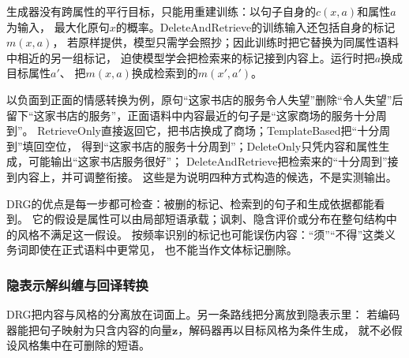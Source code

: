 生成器没有跨属性的平行目标，只能用重建训练：以句子自身的$c(x,a)$和属性$a$为输入，
最大化原句$x$的概率。DeleteAndRetrieve的训练输入还包括自身的标记$m(x,a)$，
若原样提供，模型只需学会照抄；因此训练时把它替换为同属性语料中相近的另一组标记，
迫使模型学会把检索来的标记接到内容上。运行时把$a$换成目标属性$a'$、
把$m(x,a)$换成检索到的$m(x',a')$。

以负面到正面的情感转换为例，原句“这家书店的服务令人失望”删除“令人失望”后
留下“这家书店的服务”，正面语料中内容最近的句子是“这家商场的服务十分周到”。
RetrieveOnly直接返回它，把书店换成了商场；TemplateBased把“十分周到”填回空位，
得到“这家书店的服务十分周到”；DeleteOnly只凭内容和属性生成，可能输出“这家书店服务很好”；
DeleteAndRetrieve把检索来的“十分周到”接到内容上，并可调整衔接。
这些是为说明四种方式构造的候选，不是实测输出。

DRG的优点是每一步都可检查：被删的标记、检索到的句子和生成依据都能看到。
它的假设是属性可以由局部短语承载；讽刺、隐含评价或分布在整句结构中的风格不满足这一假设。
按频率识别的标记也可能误伤内容：“须”“不得”这类义务词即使在正式语料中更常见，
也不能当作文体标记删除。

\subsubsection{隐表示解纠缠与回译转换}
\label{sec:nlp-generation-latent-style}

DRG把内容与风格的分离放在词面上。另一条路线把分离放到隐表示里：
若编码器能把句子映射为只含内容的向量$\bm z$，解码器再以目标风格为条件生成，
就不必假设风格集中在可删除的短语。

